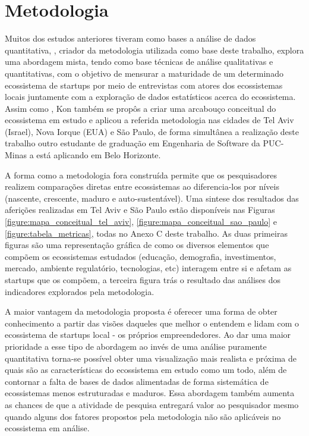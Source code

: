 \chapter{Metodologia}
\label{cap-metodologia}

Muitos dos estudos anteriores tiveram como bases a análise de dados quantitativa, , criador da metodologia utilizada como base deste trabalho, explora uma abordagem mista, tendo como base técnicas de análise qualitativas e quantitativas, com o objetivo de mensurar a maturidade de um determinado ecossistema de startups por meio de entrevistas com atores dos ecossistemas locais juntamente com a exploração de dados estatísticos acerca do ecossistema. Assim como , Kon também se propôs a criar uma arcabouço conceitual do ecossistema em estudo e aplicou a referida metodologia nas cidades de Tel Aviv (Israel), Nova Iorque (EUA) e São Paulo, de forma simultânea a realização deste trabalho outro estudante de graduação em Engenharia de Software da PUC-Minas a está aplicando em Belo Horizonte. 

A forma como a metodologia fora construída permite que os pesquisadores realizem comparações diretas entre ecossistemas ao diferencia-los por níveis (nascente, crescente, maduro e auto-sustentável). Uma sintese dos resultados das aferições realizadas em Tel Aviv e São Paulo estão disponíveis nas Figuras \ref{figure:mapa_conceitual_tel_aviv}, \ref{figure:mapa_conceitual_sao_paulo} e \ref{figure:tabela_metricas}, todas no Anexo C deste trabalho. As duas primeiras figuras são uma representação gráfica de como os diversos elementos que compõem os ecossistemas estudados (educação, demografia, investimentos, mercado, ambiente regulatório, tecnologias, etc) interagem entre si e afetam as startups que os compõem, a terceira figura trás o resultado das análises dos indicadores explorados pela metodologia.

A maior vantagem da metodologia proposta é oferecer uma forma de obter conhecimento a partir das visões daqueles que melhor o entendem e lidam com o ecossistema de startups local - os próprios empreendedores. Ao dar uma maior prioridade a esse tipo de abordagem ao invés de uma análise puramente quantitativa torna-se possível obter uma visualização mais realista e próxima de quais são as características do ecossistema em estudo como um todo, além de contornar a falta de bases de dados alimentadas de forma sistemática de ecossistemas menos estruturadas e maduros. Essa abordagem também aumenta as chances de que a atividade de pesquisa entregará valor ao pesquisador mesmo quando alguns dos fatores propostos pela metodologia não são aplicáveis no ecossistema em análise.

